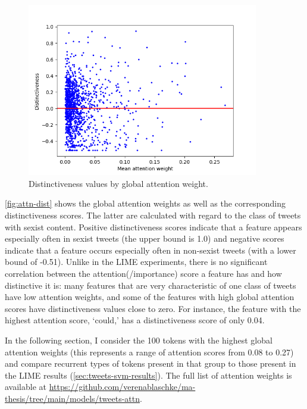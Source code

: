 \begin{figure}[htbp]
    \centering
    \includegraphics[width=0.9\textwidth]{figures/3-dialects/attention-distinctiveness.png}
    \caption[Distinctiveness values by attention weight for features in the Twitter data]{Distinctiveness values by global attention weight.}
    \label{fig:attn-dist}
\end{figure}

\autoref{fig:attn-dist} shows the global attention weights as well as the corresponding distinctiveness scores.
The latter are calculated with regard to the class of tweets with sexist content.
Positive distinctiveness scores indicate that a feature appears especially often in sexist tweets (the upper bound is 1.0) and negative scores indicate that a feature occurs especially often in non-sexist tweets (with a lower bound of -0.51).
Unlike in the LIME experiments, there is no significant correlation between the attention(/importance) score a feature has and how distinctive it is: many features that are very characteristic of one class of tweets have low attention weights, and some of the features with high global attention scores have distinctiveness values close to zero.
For instance, the feature with the highest attention score,  `could,' has a distinctiveness score of only 0.04.

In the following section, I consider the 100 tokens with the highest global attention weights (this represents a range of attention scores from 0.08 to 0.27) and compare recurrent types of tokens present in that group to those present in the LIME results (\autoref{sec:tweets-svm-results}).
The full list of attention weights is available at \url{https://github.com/verenablaschke/ma-thesis/tree/main/models/tweets-attn}.


